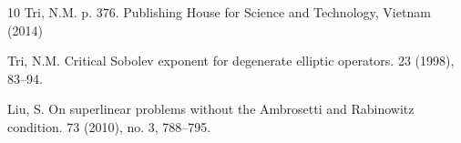 \documentclass[10pt, reqno]{amsart}
\begin{document}
\begin{thebibliography}{10}
		{\sc Tri, N.M.}
		\newblock p. 376. Publishing House for Science and Technology, Vietnam (2014)
		
		{\sc Tri, N.M.}
		\newblock Critical Sobolev exponent for degenerate elliptic operators.
		 23 (1998), 83–94.
		
		{\sc Liu, S.}
		\newblock On superlinear problems without the Ambrosetti and Rabinowitz condition.
		 73 (2010), no. 3, 788–795.
		
		
		
		
		
	\end{thebibliography}
	
\end{document}
